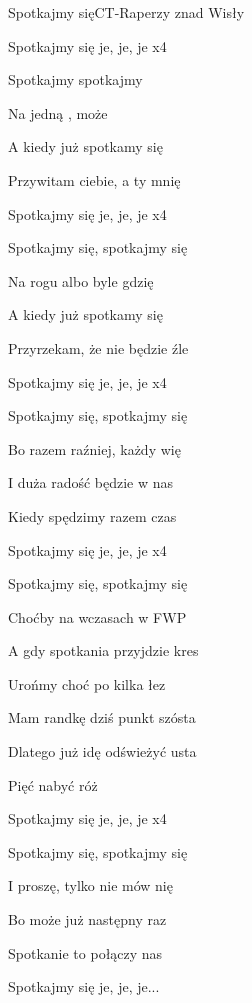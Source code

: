 \begin{song}{Spotkajmy się}{C}{}{T-Raperzy znad Wisły}{}{}
	\begin{SBChorus}
	Spotkajmy się je, je, je x4
	\end{SBChorus}
	\begin{SBVerse}
	Spotkajmy  spotkajmy 

	Na jedną , może 

	A kiedy już spotkamy się

	Przywitam ciebie, a ty mnię
	\end{SBVerse}
	\begin{SBChorus}
	Spotkajmy się je, je, je x4
	\end{SBChorus}
	\begin{SBVerse}
	Spotkajmy się, spotkajmy się

	Na rogu albo byle gdzię

	A kiedy już spotkamy się

	Przyrzekam, że nie będzie źle
	\end{SBVerse}
	\begin{SBChorus}
	Spotkajmy się je, je, je x4
	\end{SBChorus}
	\begin{SBVerse}
	Spotkajmy się, spotkajmy się

	Bo razem raźniej, każdy wię

	I duża radość będzie w nas

	Kiedy spędzimy razem czas
	\end{SBVerse}
	\begin{SBChorus}
	Spotkajmy się je, je, je x4
	\end{SBChorus}
	\begin{SBVerse}
	Spotkajmy się, spotkajmy się

	Choćby na wczasach w FWP

	A gdy spotkania przyjdzie kres

	Urońmy choć po kilka łez
	\end{SBVerse}
	\begin{SBVerse}
	Mam randkę dziś punkt szósta

	Dlatego już idę odświeżyć usta

	Pięć nabyć róż
	\end{SBVerse}
	\begin{SBChorus}
	Spotkajmy się je, je, je x4
	\end{SBChorus}
	\begin{SBVerse}
	Spotkajmy się, spotkajmy się

	I proszę, tylko nie mów nię

	Bo może już następny raz

	Spotkanie to połączy nas

	Spotkajmy się je, je, je...
	\end{SBVerse}
\end{song}
